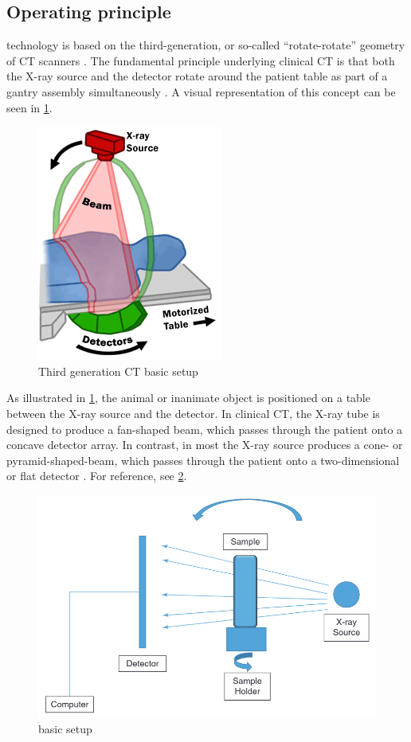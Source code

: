 \subsection{Operating principle}\label{s:b-mct-operation}
\mct\space technology is based on the third-generation, or so-called ``rotate-rotate'' geometry of CT scanners \cite{flohrCTSystems2013}.
The fundamental principle underlying clinical CT is that both the X-ray source and the detector rotate around the patient table as part of a gantry assembly simultaneously \cite{flohrCTSystems2013}.
A visual representation of this concept can be seen in \cref{fig:3ct}.
\begin{figure}[h]
	\centerline{
		\includegraphics[scale=0.5]{images/ct.png}}
	\caption{Third generation CT basic setup \cite{fdaDrawingCTFan2019}}\label{fig:3ct}
\end{figure}

\noindent
As illustrated in \cref{fig:3ct}, the animal or inanimate object is positioned on a table between the X-ray source and the detector.
In clinical CT, the X-ray tube is designed to produce a fan-shaped beam, which passes through the patient onto a concave detector array.
In contrast, in most \mct\space the X-ray source produces a cone- or pyramid-shaped-beam, which passes through the patient onto a two-dimensional or flat detector \cite{babaComparisonFlatpanelDetector2002,clarkAdvancesMicroCTImaging2021}.
For reference, see \cref{fig:mct}.
\begin{figure}[h]
	\centerline{
		\includegraphics[scale=0.5]{images/mct.png}}
	\caption{\mct\space basic setup\cite{orhanMicrocomputedTomographyMicroCT2020}}\label{fig:mct}
\end{figure}

